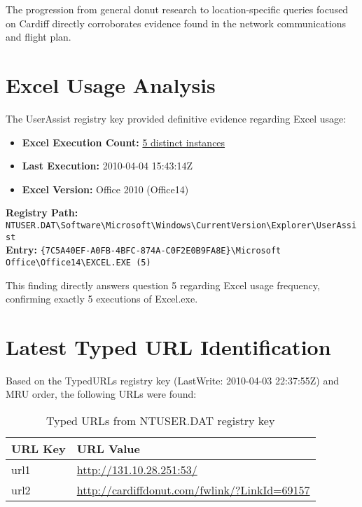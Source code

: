 The progression from general donut research to location-specific queries focused on Cardiff directly corroborates evidence found in the network communications and flight plan.

\section{Excel Usage Analysis}
The UserAssist registry key provided definitive evidence regarding Excel usage:

\begin{itemize}
    \item \textbf{Excel Execution Count:} \underline{5 distinct instances}
    \item \textbf{Last Execution:} 2010-04-04 15:43:14Z
    \item \textbf{Excel Version:} Office 2010 (Office14)
\end{itemize}

\textbf{Registry Path:} \texttt{NTUSER.DAT\textbackslash Software\textbackslash Microsoft\textbackslash Windows\textbackslash CurrentVersion\textbackslash Explorer\textbackslash UserAssist}\\
\textbf{Entry:} \texttt{\{7C5A40EF-A0FB-4BFC-874A-C0F2E0B9FA8E\}\textbackslash Microsoft Office\textbackslash Office14\textbackslash EXCEL.EXE (5)}

This finding directly answers question 5 regarding Excel usage frequency, confirming exactly 5 executions of Excel.exe.

\section{Latest Typed URL Identification}
Based on the TypedURLs registry key (LastWrite: 2010-04-03 22:37:55Z) and MRU order, the following URLs were found:

\begin{table}[htbp]
    \centering
    \begin{tabular}{|l|p{11cm}|}
        \hline
        \textbf{URL Key} & \textbf{URL Value} \\
        \hline
        url1 & \url{http://131.10.28.251:53/} \\
        \hline
        url2 & \url{http://cardiffdonut.com/fwlink/?LinkId=69157} \\
        \hline
    \end{tabular}
    \caption{Typed URLs from NTUSER.DAT registry key}
    \label{tab:typed_urls}
\end{table}

